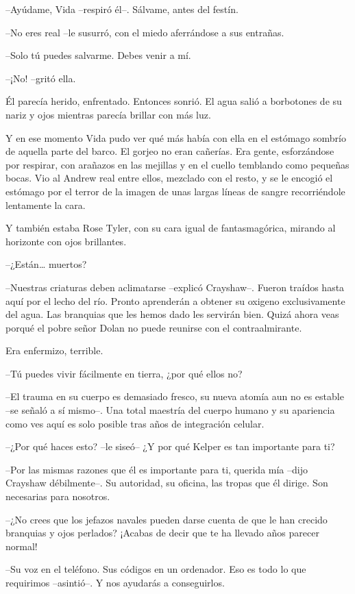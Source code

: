 {--Ayúdame, Vida --respiró él--. Sálvame, antes del festín.}

{--No eres real --le susurró, con el miedo aferrándose a sus entrañas.}

{--Solo tú puedes salvarme. Debes venir a mí.}

{--¡No! --gritó ella.}

{Él parecía herido, enfrentado. Entonces sonrió. El agua salió a
borbotones de su nariz y ojos mientras parecía brillar con más luz.}

{Y en ese momento Vida pudo ver qué más había con ella en el estómago
 sombrío de aquella parte del barco. El gorjeo no eran cañerías. Era
 gente, esforzándose por respirar, con arañazos en las mejillas y en el
 cuello temblando como pequeñas bocas. Vio al Andrew real entre ellos,
 mezclado con el resto, y se le encogió el estómago por el terror de la
 imagen de unas largas líneas de sangre recorriéndole lentamente la
cara.}

{Y también estaba Rose Tyler, con su cara igual de fantasmagórica,
mirando al horizonte con ojos brillantes.}

{--¿Están\ldots{} muertos?}

{--Nuestras criaturas deben aclimatarse --explicó Crayshaw--. Fueron
 traídos hasta aquí por el lecho del río. Pronto aprenderán a obtener su
 oxigeno exclusivamente del agua. Las branquias que les hemos dado les
 servirán bien. Quizá ahora veas porqué el pobre señor Dolan no puede
reunirse con el contraalmirante.}

{Era enfermizo, terrible.}

{--Tú puedes vivir fácilmente en tierra, ¿por qué ellos no?}

{--El trauma en su cuerpo es demasiado fresco, su nueva atomía aun no es
 estable --se señaló a sí mismo--. Una total maestría del cuerpo humano y
 su apariencia como ves aquí es solo posible tras años de integración
celular.}

{--¿Por qué haces esto? --le siseó-- ¿Y por qué Kelper es tan importante
para ti?}

{--Por las mismas razones que él es importante para ti, querida mía
 --dijo Crayshaw débilmente--. Su autoridad, su oficina, las tropas que
él dirige. Son necesarias para nosotros.}

{--¿No crees que los jefazos navales pueden darse cuenta de que le han
 crecido branquias y ojos perlados? ¡Acabas de decir que te ha llevado
años parecer normal!}

{--Su voz en el teléfono. Sus códigos en un ordenador. Eso es todo lo
que requirimos --asintió--. Y nos ayudarás a conseguirlos.}

